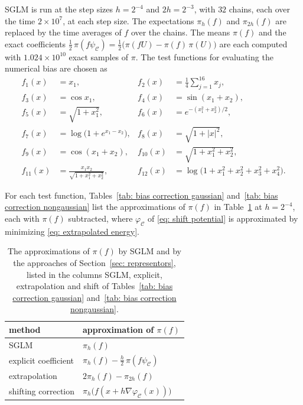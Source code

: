 SGLM is run at the step sizes $h = 2^{-4}$ and $2h = 2^{-3}$, with $32$ chains, each over the time $2 \times 10^7$, at each step size. The expectations $\pi_h(f)$ and $\pi_{2h}(f)$ are replaced by the time averages of $f$ over the chains. The means $\pi(f)$ and the exact coefficients $\frac12\, \pi(f \psi_{\mathcal C}) = \frac12 \bigl( \pi(fU) - \pi(f)\, \pi(U) \bigr)$ are each computed with $1.024 \times 10^{10}$ exact samples of $\pi$. The test functions for evaluating the numerical bias are chosen as
\begin{align*}
    f_1(x) &= x_1 , & f_2(x) &= \frac14 \sum_{j=1}^{16} x_j , \\
    f_3(x) &= \cos x_1 , & f_4(x) &= \sin(x_1 + x_2) , \\
    f_5(x) &= \sqrt{1 + x_1^2} , & f_6(x) &= e^{-(x_1^2 + x_2^2)/2} , \\
    f_7(x) &= \log\bigl( 1 + e^{x_1 - x_2} \bigr) , & f_8(x) &= \sqrt{1 + |x|^2} , \\
    f_9(x) &= \cos(x_1 + x_2) , & f_{10}(x) &= \sqrt{1 + x_1^2 + x_2^2} , \\
    f_{11}(x) &= \frac{x_1 x_2}{\sqrt{1 + x_1^2 + x_2^2}} , & f_{12}(x) &= \log\bigl( 1 + x_1^2 + x_2^2 + x_3^2 + x_4^2 \bigr) .
\end{align*}

For each test function, Tables~\ref{tab: bias correction gaussian} and~\ref{tab: bias correction nongaussian} list the approximations of $\pi(f)$ in Table~\ref{tab: approximations} at $h = 2^{-4}$, each with $\pi(f)$ subtracted, where $\varphi_{\mathcal C}$ of \eqref{eq: shift potential} is approximated by minimizing \eqref{eq: extrapolated energy}.

\begin{table}[htb]
\centering
\small
\begin{tabular}{ll}
\toprule
method & approximation of $\pi(f)$ \\
\midrule
SGLM & $\pi_h(f)$ \\
explicit coefficient & $\pi_h(f) - \frac h2\, \pi(f \psi_{\mathcal C})$ \\
extrapolation & $2\pi_h(f) - \pi_{2h}(f)$ \\
shifting correction & $\pi_h\bigl( f(x + h \nabla \varphi_{\mathcal C}(x)) \bigr)$ \\
\bottomrule
\end{tabular}
\caption{The approximations of $\pi(f)$ by SGLM and by the approaches of Section~\ref{sec: representors}, listed in the columns SGLM, explicit, extrapolation and shift of Tables~\ref{tab: bias correction gaussian} and~\ref{tab: bias correction nongaussian}.}
\label{tab: approximations}
\end{table}

